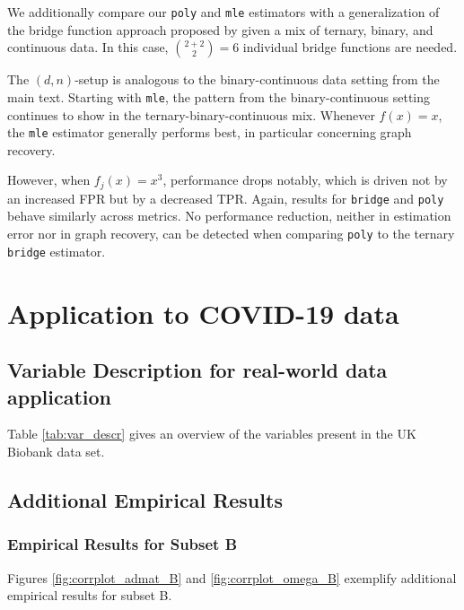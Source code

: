 We additionally compare our \texttt{poly} and \texttt{mle} estimators with a generalization of the bridge function approach proposed by \citet{Quan18} given a mix of ternary, binary, and continuous data. In this case, $ \binom{2+2}{2} = 6$ individual bridge functions are needed.

The $(d,n)$-setup is analogous to the binary-continuous data setting from the main text. Starting with \texttt{mle}, the pattern from the binary-continuous setting continues to show in the ternary-binary-continuous mix. Whenever $f(x)=x$, the \texttt{mle} estimator generally performs best, in particular concerning graph recovery.



However, when $f_j(x)=x^3$, performance drops notably, which is driven not by an increased FPR but by a decreased TPR.
Again, results for \texttt{bridge} and \texttt{poly} behave similarly across metrics. No performance reduction, neither in estimation error nor in graph recovery, can be detected when comparing \texttt{poly} to the ternary \texttt{bridge} estimator.


\section{Application to COVID-19 data}\label{sec::empirical_application}



\subsection{Variable Description for real-world data application}

Table \ref{tab:var_descr} gives an overview of the variables present in the UK Biobank data set.




\subsection{Additional Empirical Results}

\subsubsection*{Empirical Results for Subset B}
Figures \ref{fig:corrplot_admat_B} and \ref{fig:corrplot_omega_B} exemplify additional empirical results for subset B.

